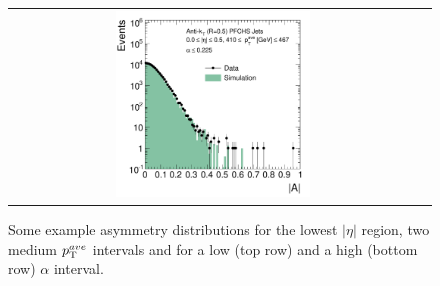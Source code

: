 \begin{figure}[!tp]
\begin{tabular}{cc}
                \includegraphics[width=0.49\textwidth]{figures/AsymmHistos_Eta0_pt9_alpha5_final_nominal_v4.pdf}
  \end{tabular}
  \caption{Some example asymmetry distributions for the lowest $|\eta|$ region, two medium $p_{\text{T}}^{ave}$ intervals and for a low (top row) and a high (bottom row) $\alpha$ interval.}
  \label{fig:asymm_dists}
\end{figure}

